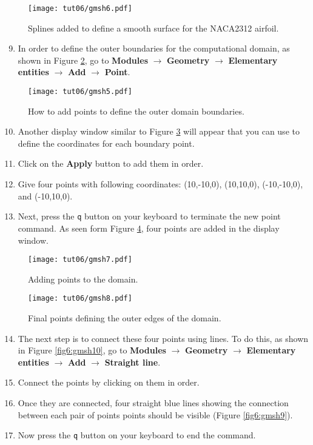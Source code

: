 \begin{figure}[ht]
    \centering
    \texttt{[image: tut06/gmsh6.pdf]}
    \caption{Splines added to define a smooth surface for the NACA2312 airfoil.}
    \label{fig6:gmsh6}
\end{figure}
\begin{enumerate}[label=\arabic*)]
	\setcounter{enumi}{8}
	\item In order to define the outer boundaries for the computational domain, as shown in Figure \ref{fig6:gmsh5}, go to \textbf{Modules} $\rightarrow$ \textbf{Geometry} $\rightarrow$ \textbf{Elementary entities} $\rightarrow$ \textbf{Add} $\rightarrow$ \textbf{Point}.
\end{enumerate}
\begin{figure}[H]
    \centering
    \texttt{[image: tut06/gmsh5.pdf]}
    \caption{How to add points to define the outer domain boundaries.}
    \label{fig6:gmsh5}
\end{figure}
\begin{enumerate}[label=\arabic*)]
	\setcounter{enumi}{9}
	\item Another display window similar to Figure \ref{fig6:gmsh7} will appear that you can use to define the coordinates for each boundary point.	
	\item Click on the \textbf{Apply} button to add them in order.
	\item Give four points with following coordinates: (10,-10,0), (10,10,0), (-10,-10,0), and (-10,10,0).
	\item Next, press the \texttt{q} button on your keyboard to terminate the new point command. As seen form Figure \ref{fig6:gmsh8}, four points are added in the display window.
\end{enumerate}
\begin{figure}[ht]
    \centering
    \texttt{[image: tut06/gmsh7.pdf]}
    \caption{Adding points to the domain.}
    \label{fig6:gmsh7}
\end{figure}
\begin{figure}[ht]
	\centering
	\texttt{[image: tut06/gmsh8.pdf]}
	\caption{Final points defining the outer edges of the domain.}
	\label{fig6:gmsh8}
\end{figure}
\begin{enumerate}[label=\arabic*)]
	\setcounter{enumi}{13}
	\item The next step is to connect these four points using lines. To do this, as shown in Figure \ref{fig6:gmsh10}, go to \textbf{Modules} $\rightarrow$ \textbf{Geometry} $\rightarrow$ \textbf{Elementary entities} $\rightarrow$ \textbf{Add} $\rightarrow$ \textbf{Straight line}.
	\item Connect the points by clicking on them in order.
	\item Once they are connected, four straight blue lines showing the connection between each pair of points points should be visible (Figure \ref{fig6:gmsh9}).
	\item Now press the \texttt{q} button on your keyboard to end the command.
\end{enumerate}
